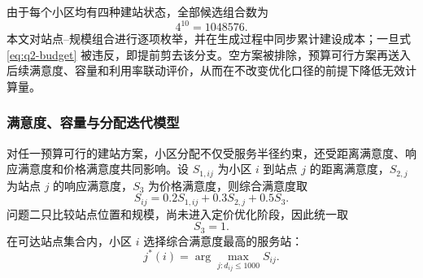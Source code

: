 由于每个小区均有四种建站状态，全部候选组合数为
\begin{equation}
  4^{10}=1048576.
  \label{eq:q2-enumeration-count}
\end{equation}
本文对站点--规模组合进行逐项枚举，并在生成过程中同步累计建设成本；一旦式 \eqref{eq:q2-budget} 被违反，即提前剪去该分支。空方案被排除，预算可行方案再送入后续满意度、容量和利用率联动评价，从而在不改变优化口径的前提下降低无效计算量。

\subsubsection{满意度、容量与分配迭代模型}

对任一预算可行的建站方案，小区分配不仅受服务半径约束，还受距离满意度、响应满意度和价格满意度共同影响。设 $S_{1,ij}$ 为小区 $i$ 到站点 $j$ 的距离满意度，$S_{2,j}$ 为站点 $j$ 的响应满意度，$S_3$ 为价格满意度，则综合满意度取
\begin{equation}
  S_{ij}=0.2S_{1,ij}+0.3S_{2,j}+0.5S_3.
  \label{eq:q2-satisfaction}
\end{equation}
问题二只比较站点位置和规模，尚未进入定价优化阶段，因此统一取
\begin{equation}
  S_3=1.
  \label{eq:q2-price-satisfaction}
\end{equation}
在可达站点集合内，小区 $i$ 选择综合满意度最高的服务站：
\begin{equation}
  j^*(i)=\arg\max_{j:d_{ij}\le1000}S_{ij}.
  \label{eq:q2-assignment}
\end{equation}

